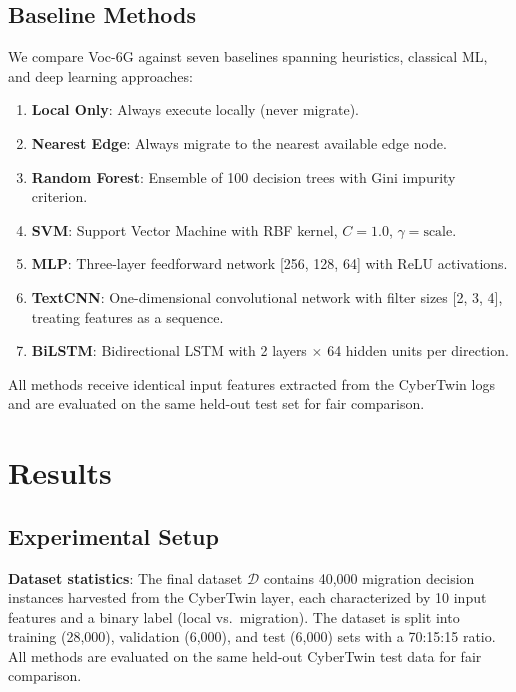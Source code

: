 \documentclass[10pt,letterpaper]{article}
\providecommand{\VocSixG}{Voc-6G}
\begin{document}
\subsection*{Baseline Methods}

We compare \VocSixG{} against seven baselines spanning heuristics, classical ML, and deep learning approaches:

\begin{enumerate}
    \item \textbf{Local Only}: Always execute locally (never migrate).
    \item \textbf{Nearest Edge}: Always migrate to the nearest available edge node.
    \item \textbf{Random Forest}: Ensemble of 100 decision trees with Gini impurity criterion.
    \item \textbf{SVM}: Support Vector Machine with RBF kernel, $C=1.0$, $\gamma=\text{scale}$.
    \item \textbf{MLP}: Three-layer feedforward network [256, 128, 64] with ReLU activations.
    \item \textbf{TextCNN}: One-dimensional convolutional network with filter sizes [2, 3, 4], treating features as a sequence.
    \item \textbf{BiLSTM}: Bidirectional LSTM with 2 layers $\times$ 64 hidden units per direction.
\end{enumerate}

All methods receive identical input features extracted from the CyberTwin logs and are evaluated on the same held-out test set for fair comparison.


\section*{Results}
\label{sec:experiments}

\subsection*{Experimental Setup}

\textbf{Dataset statistics}: The final dataset $\mathcal{D}$ contains 40,000 migration decision instances harvested from the CyberTwin layer, each characterized by 10 input features and a binary label (local vs.\ migration). The dataset is split into training (28,000), validation (6,000), and test (6,000) sets with a 70:15:15 ratio. All methods are evaluated on the same held-out CyberTwin test data for fair comparison.
\end{document}
